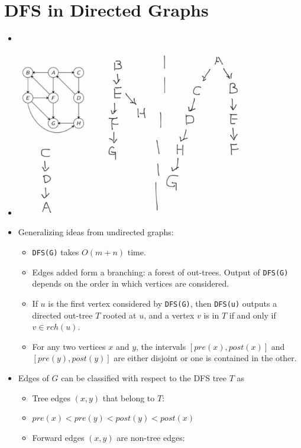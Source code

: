 \section{DFS in Directed Graphs}
\begin{itemize}
    \item[] 
    \item[] \includegraphics[width=0.8\textwidth]{lecture17/images/directed-dfs-tree-time.jpg}
    \item Generalizing ideas from undirected graphs:
    \begin{itemize}
        \item \texttt{DFS(G)} takes $O(m + n)$ time.
        \item Edges added form a branching: a forest of out-trees. Output of \texttt{DFS(G)} depends on the order in which vertices are considered.
        \item If $u$ is the first vertex considered by \texttt{DFS(G)}, then \texttt{DFS(u)} outputs a directed out-tree $T$ rooted at $u$, and a vertex $v$ is in $T$ if and only if $v \in rch(u)$.
        \item For any two vertices $x$ and $y$, the intervals $[pre(x), post(x)]$ and $[pre(y), post(y)]$ are either disjoint or one is contained in the other.
    \end{itemize}
    \item Edges of $G$ can be classified with respect to the DFS tree $T$ as
    \begin{itemize}
        \item Tree edges $(x, y)$ that belong to $T$:
        \item[] $pre(x) < pre(y) < post(y) < post(x)$
        \item Forward edges $(x, y)$ are non-tree edges:

\end{itemize}
\end{itemize}

